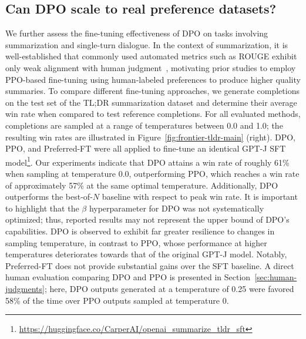 \subsection{Can DPO scale to real preference datasets?}
\label{sec:dpo-real-datasets}
We further assess the fine-tuning effectiveness of DPO on tasks involving summarization and single-turn dialogue. In the context of summarization, it is well-established that commonly used automated metrics such as ROUGE exhibit only weak alignment with human judgment~\citep{stiennon2022learning}, motivating prior studies to employ PPO-based fine-tuning using human-labeled preferences to produce higher quality summaries. To compare different fine-tuning approaches, we generate completions on the test set of the TL;DR summarization dataset and determine their average win rate when compared to test reference completions. For all evaluated methods, completions are sampled at a range of temperatures between 0.0 and 1.0; the resulting win rates are illustrated in Figure~\ref{fig:frontier-tldr-main} (right). DPO, PPO, and Preferred-FT were all applied to fine-tune an identical GPT-J SFT model\footnote{\url{https://huggingface.co/CarperAI/openai_summarize_tldr_sft}}. Our experiments indicate that DPO attains a win rate of roughly 61\% when sampling at temperature 0.0, outperforming PPO, which reaches a win rate of approximately 57\% at the same optimal temperature. Additionally, DPO outperforms the best-of-$N$ baseline with respect to peak win rate. It is important to highlight that the $\beta$ hyperparameter for DPO was not systematically optimized; thus, reported results may not represent the upper bound of DPO's capabilities. DPO is observed to exhibit far greater resilience to changes in sampling temperature, in contrast to PPO, whose performance at higher temperatures deteriorates towards that of the original GPT-J model. Notably, Preferred-FT does not provide substantial gains over the SFT baseline. A direct human evaluation comparing DPO and PPO is presented in Section~\ref{sec:human-judgments}; here, DPO outputs generated at a temperature of 0.25 were favored 58\% of the time over PPO outputs sampled at temperature 0.

